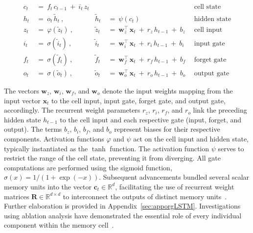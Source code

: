\begin{align}
c_t \ &= \ f_t \, c_{t-1} \ + \ i_t \, z_t &  & &\text{cell state} \\
h_t \ &= \ o_t \, \tilde{h}_t \ , & \tilde{h}_t \ &= \ \psi \left( c_t\right)
  &\text{hidden state} \\
z_t \ &= \ \varphi \left( \tilde{z}_t \right) \ , 
  &\tilde{z}_t \ &=  \ \mathbf{w}^\top_{z} \, \mathbf{x}_t \ + \
  r_{z} \, h_{t-1} \ + \  b_{z} \ \
  &\text{cell input} \\
i_t \ &= \ \sigma \left( \tilde{i}_t  \right) \ , 
  &\tilde{i}_t \ &= \ \mathbf{w}^\top_{i} \, \mathbf{x}_t \ + \
  r_{i} \, h_{t-1} \ + \  b_{i} \ \
  &\text{input gate} \\
f_t \ &= \ \sigma \left(  \tilde{f}_t \right) \ , 
  &\tilde{f}_t \ &= \ \mathbf{w}^\top_{f} \, \mathbf{x}_t  \ + \
  r_{f} \, h_{t-1} \ + \  b_{f} \ \
  &\text{forget gate} \\
o_t \ &= \ \sigma \left( \tilde{o}_t \right) \ , 
  &\tilde{o}_t  \ &= \ \mathbf{w}^\top_{o} \, \mathbf{x}_t \ + \
  r_{o} \, h_{t-1} \ + \  b_{o} \ \
  &\text{output gate} 
\end{align}

The vectors $\mathbf{w}_{z}$, $\mathbf{w}_{i}$, $\mathbf{w}_{f}$, and $\mathbf{w}_{o}$ denote the input weights mapping from the input vector $\mathbf{x}_t$ to the cell input, input gate, forget gate, and output gate, accordingly. The recurrent weight parameters $r_{z}$, $r_{i}$, $r_{f}$, and $r_{o}$ link the preceding hidden state $h_{t-1}$ to the cell input and each respective gate (input, forget, and output). The terms $b_{z}$, $b_{i}$, $b_{f}$, and $b_{o}$ represent biases for their respective components. Activation functions $\varphi$ and $\psi$ act on the cell input and hidden state, typically instantiated as the $\tanh$ function. The activation function $\psi$ serves to restrict the range of the cell state, preventing it from diverging. All gate computations are performed using the sigmoid function, $\sigma \left( x \right) = 1/(1+\exp(-x))$. Subsequent advancements bundled several scalar memory units into the vector $\mathbf{c}_t \in \mathbb{R}^{d}$, facilitating the use of recurrent weight matrices $\mathbf{R} \in \mathbb{R}^{d \times d}$ to interconnect the outputs of distinct memory units~\citep{Greff:15}. Further elaboration is provided in Appendix~\ref{sec:apporgLSTM}. Investigations using ablation analysis have demonstrated the essential role of every individual component within the memory cell~\citep{Greff:15}.

